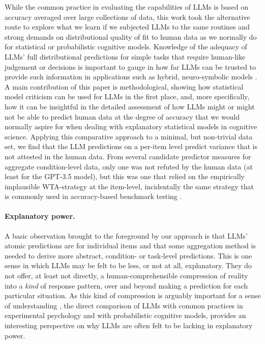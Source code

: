 \documentclass[fleqn]{article}
\begin{document}
While the common practice in evaluating the capabilities of LLMs is based on accuracy averaged over large collections of data, this work took the alternative route to explore what we learn if we subjected LLMs to the same routines and strong demands on distributional quality of fit to human data as we normally do for statistical or probabilistic cognitive models.
Knowledge of the adequacy of LLMs' full distributional predictions for simple tasks that require human-like judgement or decisions is important to gauge in how far LLMs can be trusted to provide such information in applications such as hybrid, neuro-symbolic models \citep[e.g.,][]{GarneloShanahan2019:Reconciling-dee,LewTessler2020:Leveraging-Unst,CreswellShanahan2022:Selection-Infer,Frank2023:Large-language-}.
A main contribution of this paper is methodological, showing how statistical model criticism can be used for LLMs in the first place, and, more specifically, how it can be insightful in the detailed assessment of how LLMs might or might not be able to predict human data at the degree of accuracy that we would normally aspire for when dealing with explanatory statistical models in cognitive science.
Applying this comparative approach to a minimal, but non-trivial data set, we find that the LLM predictions on a per-item level predict variance that is not attested in the human data.
From several candidate predictor measures for aggregate condition-level data, only one was not refuted by the human data (at least for the GPT-3.5 model), but this was one that relied on the empirically implausible WTA-strategy at the item-level, incidentally the same strategy that is commonly used in accuracy-based benchmark testing \citep{srivastava2023-BIGbench}.

\paragraph{Explanatory power.}
A basic observation brought to the foreground by our approach is that LLMs' atomic predictions are for individual items and that some aggregation method is needed to derive more abstract, condition- or task-level predictions.
This is one sense in which LLMs may be felt to be less, or not at all, explanatory.
They do not offer, at least not directly, a human-comprehensible compression of reality into a \emph{kind} of response pattern, over and beyond making a prediction for each particular situation.
As this kind of compression is arguably important for a sense of understanding \citep{Dellsen2020:Beyond-Explanat,Grimm2021:Understanding}, the direct comparison of LLMs with common practices in experimental psychology and with probabilistic cognitive models, provides an interesting perspective on why LLMs are often felt to be lacking in explanatory power.
\end{document}
